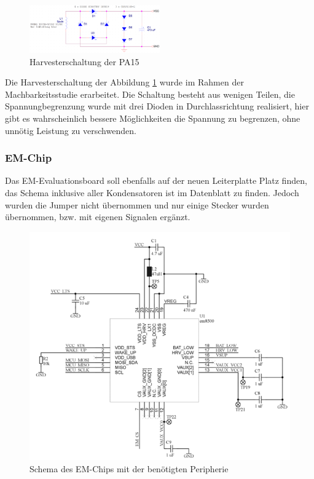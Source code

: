 \begin{figure}[ht]
    \includegraphics[width=0.5\textwidth]{3Vorgehen/imag/Schema_Harvester_PA.png}
    \caption{Harvesterschaltung der PA15}
    \label{schema_harvester_pa15} 
\end{figure}

Die Harvesterschaltung der Abbildung \ref{schema_harvester_pa15} wurde im Rahmen der Machbarkeitsstudie erarbeitet. Die Schaltung besteht aus wenigen Teilen, die Spannungbegrenzung wurde mit drei Dioden in Durchlassrichtung realisiert, hier gibt es wahrscheinlich bessere Möglichkeiten die Spannung zu begrenzen, ohne unnötig Leistung zu verschwenden.

\subsubsection{EM-Chip}

Das EM-Evaluationsboard soll ebenfalls auf der neuen Leiterplatte Platz finden, das Schema inklusive aller Kondensatoren ist im Datenblatt zu finden. Jedoch wurden die Jumper nicht übernommen und nur einige Stecker wurden übernommen, bzw. mit eigenen Signalen ergänzt.

\begin{figure}[ht]
    \includegraphics[width=1.0\textwidth]{3Vorgehen/imag/Schema_EM-Chip_inkl_Peripherie.png}
    \caption{Schema des EM-Chips mit der benötigten Peripherie}\label{schema_em-chip_inkl_peripherie} 
\end{figure}

